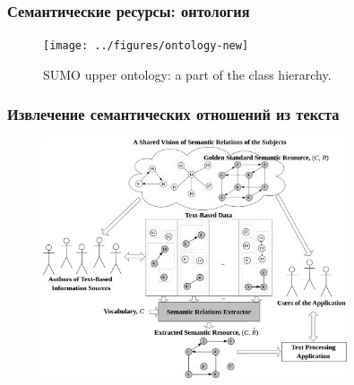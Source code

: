 \begin{frame}
\frametitle{Семантические ресурсы: онтология }

\begin{figure}
    \centering
        \texttt{[image: ../figures/ontology-new]}
    \caption{ SUMO upper ontology: a part of the class hierarchy.}
    \label{fig:sumo}
\end{figure}
\end{frame}





\begin{frame}
\frametitle{Извлечение семантических отношений из текста }

\begin{figure}
\centering
\includegraphics[width=0.8\textwidth]{../figures/extraction-3}

\label{fig:semantic-relations-extraction}
\end{figure}

\end{frame}





